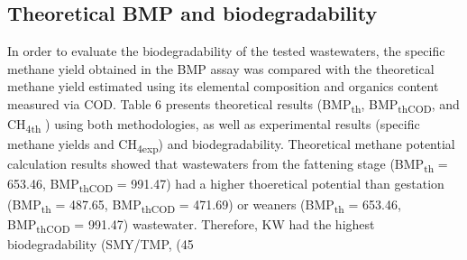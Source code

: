 \subsection{Theoretical BMP and biodegradability}
In order to evaluate the biodegradability of the tested wastewaters, the specific methane yield obtained in the BMP assay was compared with the theoretical methane yield estimated using its elemental composition and organics content measured via COD. Table 6 presents theoretical results (BMP\textsubscript{th}, BMP\textsubscript{thCOD}, and CH\textsubscript{4th} ) using both methodologies, as well as experimental results (specific methane yields and CH\textsubscript{4exp}) and  biodegradability.  Theoretical methane potential calculation results showed that wastewaters from the fattening stage (BMP\textsubscript{th} = 653.46, BMP\textsubscript{thCOD} = 991.47) had a higher thoeretical potential than gestation (BMP\textsubscript{th} = 487.65, BMP\textsubscript{thCOD} = 471.69) or weaners (BMP\textsubscript{th} = 653.46, BMP\textsubscript{thCOD} = 991.47) wastewater. Therefore, KW had the highest biodegradability (SMY/TMP, %
(45%
